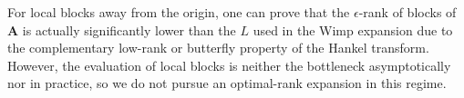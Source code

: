\begin{remark}
    For local blocks away from the origin, one can prove that the
    $\epsilon$-rank of blocks of $\bm{A}$ is actually significantly lower than
    the $L$ used in the Wimp expansion due to the complementary low-rank or
    butterfly property of the Hankel transform. However, the evaluation of local
    blocks is neither the bottleneck asymptotically nor in practice, so we do
    not pursue an optimal-rank expansion in this regime.
\end{remark}